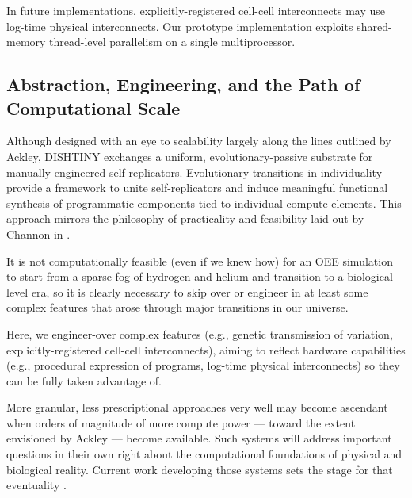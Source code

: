 In future implementations, explicitly-registered cell-cell interconnects may  use log-time physical interconnects.
Our prototype implementation exploits shared-memory thread-level parallelism on a single multiprocessor.

\subsection{Abstraction, Engineering, and the Path of Computational Scale}

Although designed with an eye to scalability largely along the lines outlined by Ackley, DISHTINY exchanges a uniform, evolutionary-passive substrate for manually-engineered self-replicators.
Evolutionary transitions in individuality provide a framework to unite self-replicators and induce meaningful functional synthesis of programmatic components tied to individual compute elements.
This approach mirrors the philosophy of practicality and feasibility laid out by Channon in \citep{channon2019maximum}.

\begin{displayquote}
It is not computationally feasible (even if we knew how) for an OEE simulation to start from a sparse fog of hydrogen and helium and transition to a biological-level era, so it is clearly necessary to skip over or engineer in at least some complex features that arose through major transitions in our universe.
\end{displayquote}

Here, we engineer-over complex features (e.g., genetic transmission of variation, explicitly-registered cell-cell interconnects), aiming to reflect hardware capabilities (e.g., procedural expression of programs, log-time physical interconnects) so they can be fully taken advantage of.

More granular, less prescriptional approaches very well may become ascendant when orders of magnitude of more compute power --- toward the extent envisioned by Ackley --- become available.
Such systems will address important questions in their own right about the computational foundations of physical and biological reality.
Current work developing those systems sets the stage for that eventuality \citep{ackley2018alife}.
